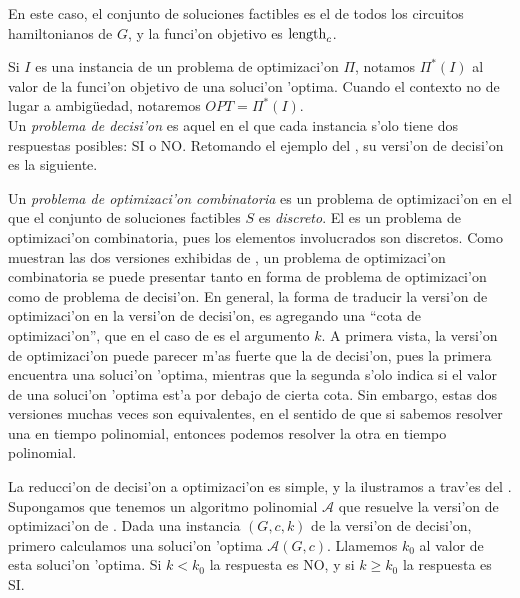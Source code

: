 \noindent
En este caso, el conjunto de soluciones factibles es el de todos los circuitos hamiltonianos de $G$, y la funci'on objetivo es $\textnormal{length}_c$.

Si $I$ es una instancia de un problema de optimizaci'on $\Pi$, notamos $\Pi^*(I)$ al valor de la funci'on objetivo de una soluci'on 'optima. Cuando el contexto no de lugar a ambig\"uedad, notaremos $OPT = \Pi^*(I)$.\\

Un \textit{problema de decisi'on} es aquel en el que cada instancia s'olo tiene dos respuestas posibles: SI o NO. Retomando el ejemplo del , su versi'on de decisi'on es la siguiente.

\clearpage


Un \textit{problema de optimizaci'on combinatoria} es un problema de optimizaci'on en el que el conjunto de soluciones factibles $S$ es \emph{discreto}. El  es un problema de optimizaci'on combinatoria, pues los elementos involucrados son discretos. Como muestran las dos versiones exhibidas de , un problema de optimizaci'on combinatoria se puede presentar tanto en forma de problema de optimizaci'on como de problema de decisi'on. En general, la forma de traducir la versi'on de optimizaci'on en la versi'on de decisi'on, es agregando una ``cota de optimizaci'on'', que en el caso de  es el argumento $k$. A primera vista, la versi'on de optimizaci'on puede parecer m'as fuerte que la de decisi'on, pues la primera encuentra una soluci'on 'optima, mientras que la segunda s'olo indica si el valor de una soluci'on 'optima est'a por debajo de cierta cota. Sin embargo, estas dos versiones muchas veces son equivalentes, en el sentido de que si sabemos resolver una en tiempo polinomial, entonces podemos resolver la otra en tiempo polinomial.

La reducci'on de decisi'on a optimizaci'on es simple, y la ilustramos a trav'es del . Supongamos que tenemos un algoritmo polinomial $\mathcal{A}$ que resuelve la versi'on de optimizaci'on de . Dada una instancia $(G, c, k)$ de la versi'on de decisi'on, primero calculamos una soluci'on 'optima $\mathcal{A}(G, c)$. Llamemos $k_0$ al valor de esta soluci'on 'optima. Si $k < k_0$ la respuesta es NO, y si $k \geq k_0$ la respuesta es SI.

